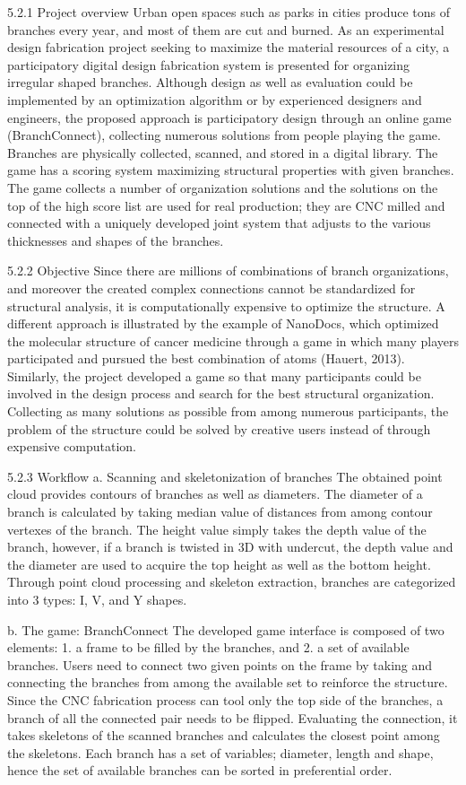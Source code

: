 5.2.1 Project overview
Urban open spaces such as parks in cities produce tons of branches every year, and most of them are cut and burned. As an experimental design fabrication project seeking to maximize the material resources of a city, a participatory digital design fabrication system is presented for organizing irregular shaped branches. Although design as well as evaluation could be implemented by an optimization algorithm or by experienced designers and engineers, the proposed approach is participatory design through an online game (BranchConnect), collecting numerous solutions from people playing the game. Branches are physically collected, scanned, and stored in a digital library. The game has a scoring system maximizing structural properties with given branches. The game collects a number of organization solutions and the solutions on the top of the high score list are used for real production; they are CNC milled and connected with a uniquely developed joint system that adjusts to the various thicknesses and shapes of the branches. 

5.2.2 Objective
Since there are millions of combinations of branch organizations, and moreover the created complex connections cannot be standardized for structural analysis, it is computationally expensive to optimize the structure. A different approach is illustrated by the example of NanoDocs, which optimized the molecular structure of cancer medicine through a game in which many players participated and pursued the best combination of atoms (Hauert, 2013). Similarly, the project developed a game so that many participants could be involved in the design process and search for the best structural organization. Collecting as many solutions as possible from among numerous participants, the problem of the structure could be solved by creative users instead of through expensive computation. 

5.2.3 Workflow
a. Scanning and skeletonization of branches
The obtained point cloud provides contours of branches as well as diameters. The diameter of a branch is calculated by taking median value of distances from among contour vertexes of the branch. The height value simply takes the depth value of the branch, however, if a branch is twisted in 3D with undercut, the depth value and the diameter are used to acquire the top height as well as the bottom height. Through point cloud processing and skeleton extraction, branches are categorized into 3 types: I, V, and Y shapes. 

b. The game: BranchConnect
The developed game interface is composed of two elements: 1. a frame to be filled by the branches, and 2. a set of available branches. Users need to connect two given points on the frame by taking and connecting the branches from among the available set to reinforce the structure. Since the CNC fabrication process can tool only the top side of the branches, a branch of all the connected pair needs to be flipped. Evaluating the connection, it takes skeletons of the scanned branches and calculates the closest point among the skeletons. Each branch has a set of variables; diameter, length and shape, hence the set of available branches can be sorted in preferential order.

